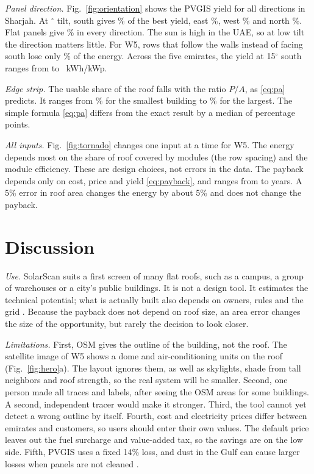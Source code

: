 \documentclass[conference]{IEEEtran}
\begin{document}
\emph{Panel direction.} Fig.~\ref{fig:orientation} shows the PVGIS yield for all directions in Sharjah. At \CfgTilt$^\circ$ tilt, south gives \OrSouth\% of the best yield, east \OrEast\%, west \OrWest\% and north \OrNorth\%. Flat panels give \OrFlat\% in every direction. The sun is high in the UAE, so at low tilt the direction matters little. For W5, rows that follow the walls instead of facing south lose only \CaseAlLoss\% of the energy. Across the five emirates, the yield at 15$^\circ$ south ranges from \OrSiteMin{} to \OrSiteMax~kWh/kWp.

\emph{Edge strip.} The usable share of the roof falls with the ratio $P/A$, as \eqref{eq:pa} predicts. It ranges from \SbMin\% for the smallest building to \SbMax\% for the largest. The simple formula \eqref{eq:pa} differs from the exact result by a median of \SbLinMed{} percentage points.

\emph{All inputs.} Fig.~\ref{fig:tornado} changes one input at a time for W5. The energy depends most on the share of roof covered by modules (the row spacing) and the module efficiency. These are design choices, not errors in the data. The payback depends only on cost, price and yield \eqref{eq:payback}, and ranges from \PayMin{} to \PayMax{} years. A 5\% error in roof area changes the energy by about 5\% and does not change the payback.

\section{Discussion}

\emph{Use.} SolarScan suits a first screen of many flat roofs, such as a campus, a group of warehouses or a city's public buildings. It is not a design tool. It estimates the technical potential; what is actually built also depends on owners, rules and the grid \cite{shi2026}. Because the payback does not depend on roof size, an area error changes the size of the opportunity, but rarely the decision to look closer.

\emph{Limitations.} First, OSM gives the outline of the building, not the roof. The satellite image of W5 shows a dome and air-conditioning units on the roof (Fig.~\ref{fig:hero}a). The layout ignores them, as well as skylights, shade from tall neighbors and roof strength, so the real system will be smaller. Second, one person made all traces and labels, after seeing the OSM areas for some buildings. A second, independent tracer would make it stronger. Third, the tool cannot yet detect a wrong outline by itself. Fourth, cost and electricity prices differ between emirates and customers, so users should enter their own values. The default price leaves out the fuel surcharge and value-added tax, so the savings are on the low side. Fifth, PVGIS uses a fixed 14\% loss, and dust in the Gulf can cause larger losses when panels are not cleaned \cite{alali2013}.
\end{document}
